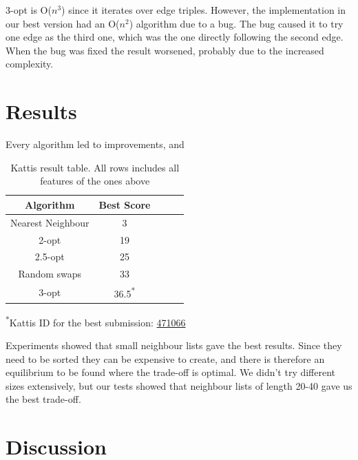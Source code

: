 \documentclass[paper=a4, fontsize=11pt,numbers=endperiod]{scrartcl} %
\numberwithin{equation}{section} %
\numberwithin{figure}{section} %
\numberwithin{table}{section} %
\begin{document}
3-opt is O($n^3$) since it iterates over edge triples.
However, the implementation in our best version had an O($n^2$) algorithm due to a bug.
The bug caused it to try one edge as the third one, which was the one directly following the second edge.
When the bug was fixed the result worsened, probably due to the increased complexity.


\newpage
\section{Results}

Every algorithm led to improvements, and 

\begin{table}[h]
  \centering
    \begin{tabular}{|c|c|c|c|c|}
    \hline
    \textbf{Algorithm} & \textbf{Best Score} \\ \hline
    Nearest Neighbour & 3 \\ \hline
    2-opt & 19 \\ \hline
    2.5-opt & 25 \\ \hline
    Random swaps & 33 \\ \hline
    3-opt & 36.5\textsuperscript{*} \\ \hline
    \end{tabular}
    \caption{Kattis result table. All rows includes all features of the ones above}
    \hspace{10pt}
  \end{table}

\textsuperscript{*}Kattis ID for the best submission: \href{https://kth.kattis.scrool.se/submission?id=471066}{471066}

Experiments showed that small neighbour lists gave the best results. Since they need to be sorted they can be expensive to create, and there is therefore an equilibrium to be found where the trade-off is optimal. We didn't try different sizes extensively, but our tests showed that neighbour lists of length 20-40 gave us the best trade-off.




\section{Discussion}
\end{document}
